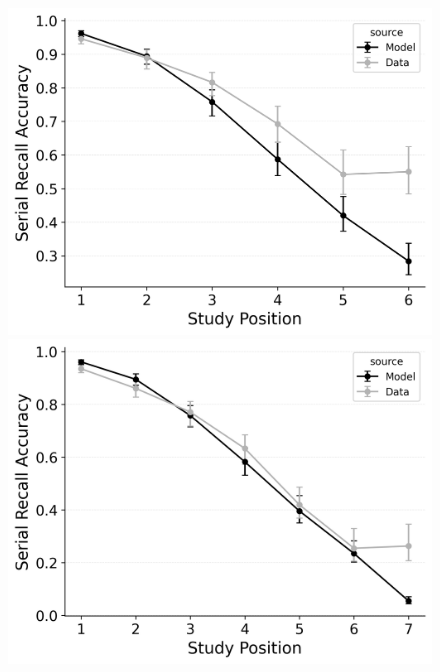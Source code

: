 \documentclass[
  man,
  floatsintext,
  longtable,
  nolmodern,
  notxfonts,
  notimes,
  draftfirst,
  colorlinks=true,linkcolor=blue,citecolor=blue,urlcolor=blue]{apa7}
\begin{document}
\begin{figure}
\begin{minipage}{0.33\linewidth}
\includegraphics{figures/bw_Gordon2021_CRU_with_Pre-Expt_and_Primacy_Confusable_Fitting_srac_LL6.png}\end{minipage}%
%
\begin{minipage}{0.33\linewidth}
\includegraphics{figures/bw_Gordon2021_CRU_with_Pre-Expt_and_Primacy_Confusable_Fitting_srac_LL7.png}\end{minipage}%
\newline
\begin{minipage}{0.33\linewidth}

\end{minipage}
\end{figure}
\end{document}
